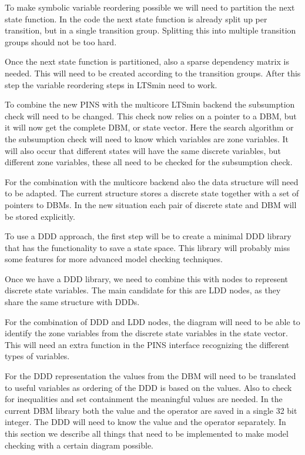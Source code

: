 To make symbolic variable reordering possible we will need to partition the next state function. In the code the next state function is already split up per transition, but in a single transition group. Splitting this into multiple transition groups should not be too hard.

Once the next state function is partitioned, also a sparse dependency matrix is needed. This will need to be created according to the transition groups. After this step the variable reordering steps in LTSmin need to work.

To combine the new PINS with the multicore LTSmin backend the subsumption check will need to be changed. This check now relies on a pointer to a DBM, but it will now get the complete DBM, or state vector. Here the search algorithm or the subsumption check will need to know which variables are zone variables. It will also occur that different states will have the same discrete variables, but different zone variables, these all need to be checked for the subsumption check.

For the combination with the multicore backend also the data structure will need to be adapted. The current structure stores a discrete state together with a set of pointers to DBMs. In the new situation each pair of discrete state and DBM will be stored explicitly.

To use a DDD approach, the first step will be to create a minimal DDD library that has the functionality to save a state space. This library will probably miss some features for more advanced model checking techniques.

Once we have a DDD library, we need to combine this with nodes to represent discrete state variables. The main candidate for this are LDD nodes, as they share the same structure with DDDs.

For the combination of DDD and LDD nodes, the diagram will need to be able to identify the zone variables from the discrete state variables in the state vector. This will need an extra function in the PINS interface recognizing the different types of variables.  

For the DDD representation the values from the DBM will need to be translated to useful variables as ordering of the DDD is based on the values. Also to check for inequalities and set containment the meaningful values are needed. In the current DBM library both the value and the operator are saved in a single 32 bit integer. The DDD will need to know the value and the operator separately.
In this section we describe all things that need to be implemented to make model checking with a certain diagram possible. 

